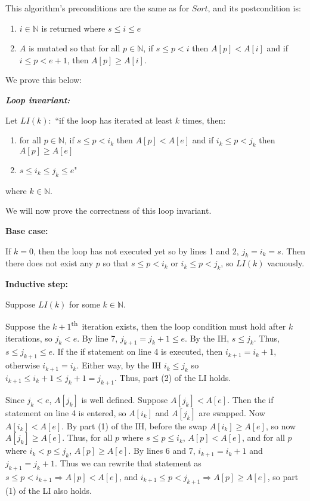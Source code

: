 \documentclass[12pt]{article}
\newcommand{\N}{\mathbb{N}}
\newcommand{\supth}{\textsuperscript{th}}
\begin{document}
\noindent This algorithm's preconditions are the same as for $Sort$, and its postcondition is:
\begin{enumerate}[label=(\arabic{enumi})]
    \item $i \in \N$ is returned where $s \leq i \leq e$
    \item $A$ is mutated so that for all $p \in \N$, if $s \leq p < i$ then $A[p] < A[i]$ and if $i \leq p < e+1$, then $A[p] \geq A[i]$.
\end{enumerate}
We prove this below:

\hfill

\noindent \textbf{\textit{Loop invariant:}}

\noindent Let $LI(k):$ ``if the loop has iterated at least $k$ times, then:
\begin{enumerate}[label=(\arabic{enumi})]
    \item for all $p \in \N$, if $s \leq p < i_k$ then $A[p] < A[e]$ and if $i_k \leq p < j_k$ then $A[p] \geq A[e]$
    \item $s \leq i_k \leq j_k \leq e$"
\end{enumerate} where $k \in \N$.

\noindent We will now prove the correctness of this loop invariant.

\noindent \textbf{Base case:}

If $k = 0$, then the loop has not executed yet so by lines 1 and 2, $j_k = i_k = s$. Then there does not exist any $p$ so that $s \leq p < i_k$ or $i_k \leq p < j_k$, so $LI(k)$ vacuously.

\noindent \textbf{Inductive step:}

Suppose $LI(k)$ for some $k \in \N$.

Suppose the $k+1$\supth\     iteration exists, then the loop condition must hold after $k$ iterations, so $j_k < e$. By line 7, $j_{k+1} = j_k + 1 \leq e$. By the IH, $s \leq j_k$. Thus, $s \leq j_{k+1} \leq e$. If the if statement on line 4 is executed, then $i_{k+1} = i_k + 1$, otherwise $i_{k+1} = i_k$. Either way, by the IH $i_k \leq j_k$ so $i_{k+1} \leq i_k + 1 \leq  j_k + 1 = j_{k+1}$. Thus, part (2) of the LI holds.

Since $j_k < e$, $A[j_k]$ is well defined. Suppose $A[j_k] < A[e]$. Then the if statement on line 4 is entered, so $A[i_k]$ and $A[j_k]$ are swapped. Now $A[i_k] < A[e]$. By part (1) of the IH, before the swap $A[i_k] \geq A[e]$, so now $A[j_k] \geq A[e]$. Thus, for all $p$ where $s \leq p \leq i_k$, $A[p] < A[e]$, and for all $p$ where $i_k < p \leq j_k$, $A[p] \geq A[e]$. By lines 6 and 7, $i_{k+1} = i_{k} + 1$ and $j_{k+1} = j_k + 1$. Thus we can rewrite that statement as $s \leq p < i_{k+1} \Rightarrow A[p] < A[e]$, and $i_{k+1} \leq p < j_{k+1} \Rightarrow A[p] \geq A[e]$, so part (1) of the LI also holds.
\end{document}
